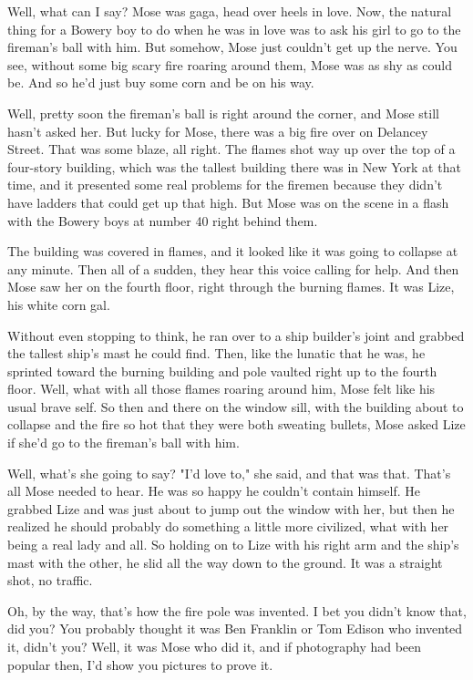 Well, what can I say? Mose was gaga, head over heels in love. Now, the natural thing for a Bowery boy to do when he was in love was to ask his girl to go to the fireman's ball with him. But somehow, Mose just couldn't get up the nerve. You see, without some big scary fire roaring around them, Mose was as shy as could be. And so he'd just buy some corn and be on his way.

Well, pretty soon the fireman's ball is right around the corner, and Mose still hasn't asked her. But lucky for Mose, there was a big fire over on Delancey Street. That was some blaze, all right. The flames shot way up over the top of a four-story building, which was the tallest building there was in New York at that time, and it presented some real problems for the firemen because they didn't have ladders that could get up that high. But Mose was on the scene in a flash with the Bowery boys at number 40 right behind them.

The building was covered in flames, and it looked like it was going to collapse at any minute. Then all of a sudden, they hear this voice calling for help. And then Mose saw her on the fourth floor, right through the burning flames. It was Lize, his white corn gal.

Without even stopping to think, he ran over to a ship builder's joint and grabbed the tallest ship's mast he could find. Then, like the lunatic that he was, he sprinted toward the burning building and pole vaulted right up to the fourth floor. Well, what with all those flames roaring around him, Mose felt like his usual brave self. So then and there on the window sill, with the building about to collapse and the fire so hot that they were both sweating bullets, Mose asked Lize if she'd go to the fireman's ball with him.

Well, what's she going to say? "I'd love to," she said, and that was that. That's all Mose needed to hear. He was so happy he couldn't contain himself. He grabbed Lize and was just about to jump out the window with her, but then he realized he should probably do something a little more civilized, what with her being a real lady and all. So holding on to Lize with his right arm and the ship's mast with the other, he slid all the way down to the ground. It was a straight shot, no traffic.

Oh, by the way, that's how the fire pole was invented. I bet you didn't know that, did you? You probably thought it was Ben Franklin or Tom Edison who invented it, didn't you? Well, it was Mose who did it, and if photography had been popular then, I'd show you pictures to prove it.

